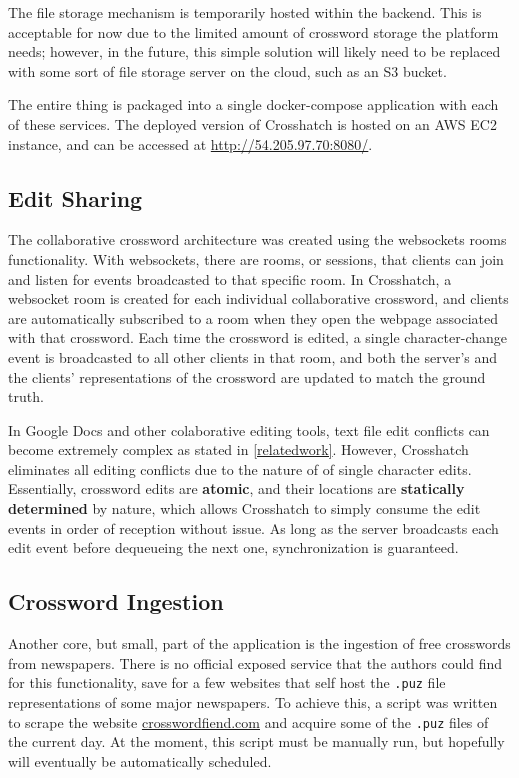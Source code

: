 \documentclass{article}
\begin{document}
The file storage mechanism is temporarily hosted within the backend. This is acceptable for now due to the limited amount of crossword storage the platform needs;
however, in the future, this simple solution will likely need to be replaced with some sort of file storage server on the cloud, such as an S3 bucket.

The entire thing is packaged into a single docker-compose application with each of these services. The deployed version of Crosshatch is hosted on an AWS EC2 instance, and can be accessed at \url{http://54.205.97.70:8080/}.
\subsection{Edit Sharing}
\label{editsharing}

The collaborative crossword architecture was created using the websockets rooms functionality. With websockets, there are rooms,
or sessions, that clients can join and listen for events broadcasted to that specific room. In Crosshatch, a websocket room is created for each individual collaborative crossword, and clients are automatically subscribed to a room when they open the webpage associated with that crossword. Each time the crossword is edited,
a single character-change event is broadcasted to all other clients in that room, and both the server's and the clients' representations of the crossword are updated
to match the ground truth.

In Google Docs and other colaborative editing tools, text file edit conflicts can become extremely complex as stated in \ref{relatedwork}. However, Crosshatch eliminates all
editing conflicts due to the nature of of single character edits.
Essentially, crossword edits are \textbf{atomic}, and their locations are \textbf{statically determined} by nature, which allows Crosshatch to simply consume the edit events in order of reception without issue. As long as the server broadcasts each edit event before dequeueing the next one, synchronization is guaranteed.

\subsection{Crossword Ingestion}

Another core, but small, part of the application is the ingestion of free crosswords from newspapers. There is no official exposed service
that the authors could find for this functionality, save for a few websites that self host the \texttt{.puz} file representations of some major newspapers.
To achieve this, a script was written to scrape the website \url{crosswordfiend.com} and acquire some of the \texttt{.puz} files of the current day.
At the moment, this script must be manually run, but hopefully will eventually be automatically scheduled.
\end{document}

